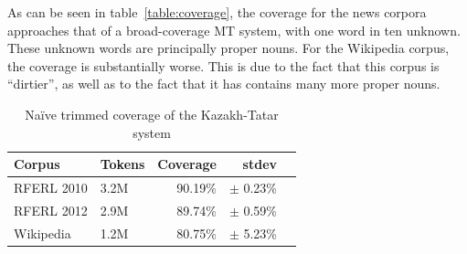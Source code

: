 \documentclass[11pt]{article}
\begin{document}

As can be seen in table~\ref{table:coverage}, the coverage for the news corpora approaches that of a broad-coverage MT system, with one word in ten unknown.  These unknown words are principally proper nouns.  For the Wikipedia corpus, the coverage is substantially worse.  This is due to the fact that this corpus is ``dirtier'', as well as to the fact that it has contains many more proper nouns.

\begin{table}
	\centering
	\begin{tabular}{llrrr}
		\toprule
		Corpus          & Tokens & Coverage & stdev\\
		\midrule
		RFERL 2010      & 3.2M   & 90.19\% & $\pm$ 0.23\% \\
		RFERL 2012      & 2.9M   & 89.74\% & $\pm$ 0.59\% \\
		Wikipedia       & 1.2M   & 80.75\% & $\pm$ 5.23\% \\
		\bottomrule
	\end{tabular}
	\caption{Naïve trimmed coverage of the Kazakh-Tatar system}
	\label{table:trimmedcoverage}
\end{table}
\end{document}
